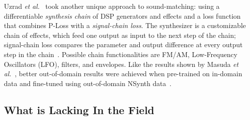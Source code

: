 \documentclass[lettersize,journal]{IEEEtran}
\providecommand{\gls}[1]{#1}
\begin{document}
Uzrad \textit{et al.}~\cite{uzrad2024diffmoog} took another unique approach to sound-matching: using a differentiable \textit{synthesis chain} of DSP generators and effects and a loss function that combines P-Loss with a \textit{signal-chain loss}. The synthesizer is a customizable chain of effects, which feed one output as input to the next step of the chain; signal-chain loss compares the parameter and output difference at every output step in the chain~\cite{uzrad2024diffmoog}. Possible chain functionalities are FM/AM, Low-Frequency Oscillators (\gls{LFO}), filters, and envelopes. Like the results shown by Masuda \textit{et al.}~\cite{masuda2021soundmatch}, better out-of-domain results were achieved when pre-trained on in-domain data and fine-tuned using out-of-domain NSynth data~\cite{engel2017neural}. 


\subsection{What is Lacking In the Field}
\label{sec:lacking}
\end{document}
